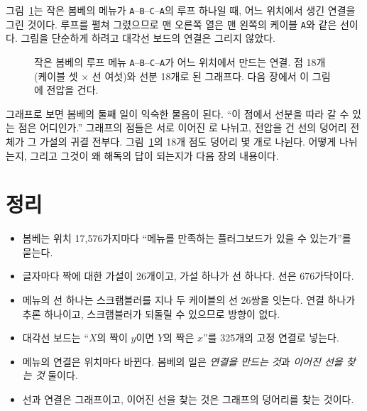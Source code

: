 그림~\ref{fig:c-graph}는 작은 봄베의 메뉴가 \texttt{A}--\texttt{B}--\texttt{C}--\texttt{A}의 루프 하나일 때, 어느
위치에서 생긴 연결을 그린 것이다. 루프를 펼쳐 그렸으므로 맨 오른쪽 열은 맨 왼쪽의 케이블 \texttt{A}와 같은 선이다.
그림을 단순하게 하려고 대각선 보드의 연결은 그리지 않았다.

\begin{figure}[ht]
\centering
{}
\caption{작은 봄베의 루프 메뉴 \texttt{A}--\texttt{B}--\texttt{C}--\texttt{A}가 어느 위치에서 만드는 연결. 점 18개(케이블 셋 × 선
여섯)와 선분 18개로 된 그래프다. 다음 장에서 이 그림에 전압을 건다.}
\label{fig:c-graph}
\end{figure}

\Why 그래프로 보면 봄베의 둘째 일이 익숙한 물음이 된다. ``이 점에서 선분을 따라 갈 수 있는 점은 어디인가.''
그래프의 점들은 서로 이어진 로 나뉘고, 전압을 건 선의 덩어리 전체가 그 가설의 귀결
전부다. 그림~\ref{fig:c-graph}의 18개 점도 덩어리 몇 개로 나뉜다. 어떻게 나뉘는지, 그리고 그것이 왜 해독의 답이
되는지가 다음 장의 내용이다.

\section{정리}

\begin{itemize}
\item 봄베는 위치 17,576가지마다 ``메뉴를 만족하는 플러그보드가 있을 수 있는가''를 묻는다.
\item 글자마다 짝에 대한 가설이 26개이고, 가설 하나가 선 하나다. 선은 676가닥이다.
\item 메뉴의 선 하나는 스크램블러를 지나 두 케이블의 선 26쌍을 잇는다. 연결 하나가 추론 하나이고, 스크램블러가
되돌릴 수 있으므로 방향이 없다.
\item 대각선 보드는 ``$X$의 짝이 $y$이면 $Y$의 짝은 $x$''를 325개의 고정 연결로 넣는다.
\item 메뉴의 연결은 위치마다 바뀐다. 봄베의 일은 \emph{연결을 만드는 것}과 \emph{이어진 선을 찾는 것} 둘이다.
\item 선과 연결은 그래프이고, 이어진 선을 찾는 것은 그래프의 덩어리를 찾는 것이다.
\end{itemize}
